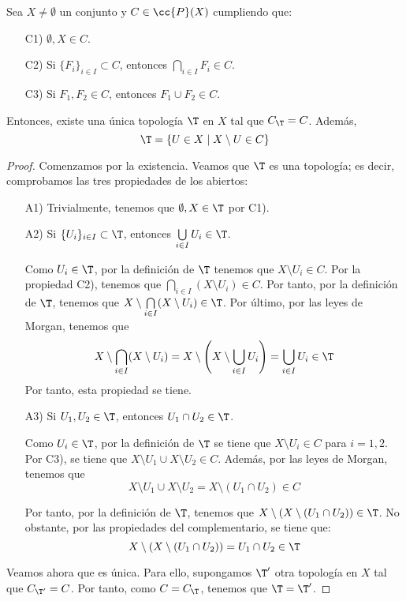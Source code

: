 \begin{teo}
    Sea $X\neq \emptyset$ un conjunto y $C\in \cc{P}(X)$ cumpliendo que:
    \begin{enumerate}
        \item[C1)] $\emptyset,X\in C$.
        \item[C2)] Si $\{F_i\}_{i\in I}\subset C$, entonces $\bigcap\limits_{i\in I}F_i\in C$.
        \item[C3)] Si $F_1, F_2\in C$, entonces $F_1\cup F_2\in C$.
    \end{enumerate}

    Entonces, existe una única topología $\T$ en $X$ tal que $C_\T=C$. Además,
    \begin{equation*}
        \T=\{U\in X\mid X\setminus U\in C\}
    \end{equation*}
\end{teo}
\begin{proof}
    Comenzamos por la existencia. Veamos que $\T$ es una topología; es decir, comprobamos las tres propiedades de los abiertos:
    \begin{enumerate}
        \item[A1)] Trivialmente, tenemos que $\emptyset, X\in \T$ por C1).
        \item[A2)] Si $\{U_i\}_{i\in I}\subset \T$, entonces $\bigcup\limits_{i\in I}U_i\in \T$.

        Como $U_i\in \T$, por la definición de $\T$ tenemos que $X\setminus U_i\in C$. Por la propiedad C2), tenemos que $\bigcap\limits_{i\in I}(X\setminus U_i)\in C$. Por tanto, por la definición de $\T$, tenemos que $X\setminus \bigcap\limits_{i\in I}(X\setminus U_i)\in \T$. Por último, por las leyes de Morgan, tenemos que 
        \begin{equation*}
            X\setminus \bigcap\limits_{i\in I}(X\setminus U_i) = X\setminus \left(X\setminus\bigcup\limits_{i\in I}U_i \right) = \bigcup\limits_{i\in I}U_i \in \T
        \end{equation*}
        Por tanto, esta propiedad se tiene.

        \item [A3)] Si $U_1,U_2\in \T$, entonces $U_1\cap U_2\in \T$.

        Como $U_i\in \T$, por la definición de $\T$ se tiene que $X\setminus U_i\in C$ para $i=1,2$. Por C3), se tiene que $X\setminus U_1 \cup X\setminus U_2\in C$. Además, por las leyes de Morgan, tenemos que 
        $$X\setminus U_1 \cup X\setminus U_2 = X\setminus (U_1\cap U_2)\in C$$
        
        Por tanto, por la definición de $\T$, tenemos que $X\setminus \left(X\setminus (U_1\cap U_2)\right)\in \T$. No obstante, por las propiedades del complementario, se tiene que:
        \begin{equation*}
            X\setminus \left(X\setminus (U_1\cap U_2)\right)=U_1\cap U_2 \in \T
        \end{equation*}
    \end{enumerate}


    Veamos ahora que es única. Para ello, supongamos $\T'$ otra topología en $X$ tal que $C_{\T'}=C$. Por tanto, como $C=C_{\T}$, tenemos que $\T=\T'$.
\end{proof}

